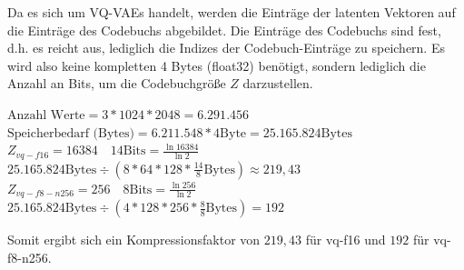         Da es sich um VQ-VAEs handelt, werden die Einträge der latenten Vektoren auf die Einträge des Codebuchs abgebildet. Die Einträge des Codebuchs sind fest, d.h. es reicht aus, lediglich die Indizes der Codebuch-Einträge zu speichern. Es wird also keine kompletten 4 Bytes (float32) benötigt, sondern lediglich die Anzahl an Bits, um die Codebuchgröße $Z$ darzustellen.
        
        \begin{center}  
                $\text{Anzahl Werte} = 3 * 1024  * 2048 = 6.291.456$ \\
                $\text{Speicherbedarf (Bytes)} = 6.211.548 * 4 \text{Byte} = 25.165.824 \text{Bytes}$\\
                $Z_{vq-f16} = 16384 \quad 14\text{Bits} = \frac{\ln{16384}}{\ln{2}}$\\
                $25.165.824\text{Bytes} \div (8 * 64 * 128 * \frac{14}{8}\text{Bytes}) \approx 219,43$
                $Z_{vq-f8-n256} = 256 \quad 8\text{Bits} = \frac{\ln{256}}{\ln{2}}$\\
                $25.165.824\text{Bytes} \div (4 * 128 * 256 * \frac{8}{8}\text{Bytes}) = 192$
         \end{center}

        Somit ergibt sich ein Kompressionsfaktor von $219,43$ für vq-f16 und $192$ für vq-f8-n256.